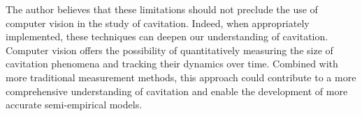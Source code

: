 The author believes that these limitations should not preclude the use of computer vision in the study of cavitation. Indeed, when appropriately implemented, these techniques can deepen our understanding of cavitation. Computer vision offers the possibility of quantitatively measuring the size of cavitation phenomena and tracking their dynamics over time. Combined with more traditional measurement methods, this approach could contribute to a more comprehensive understanding of cavitation and enable the development of more accurate semi-empirical models.


